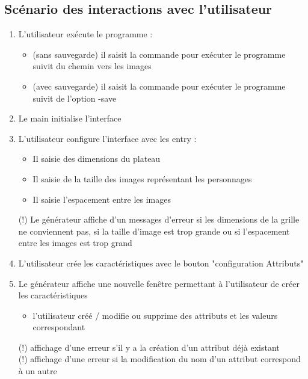 \documentclass[a4paper]{article}
\begin{document}
 \subsection{Scénario des interactions avec l'utilisateur}
 \begin{enumerate}
 \item L'utilisateur exécute le programme : 
 \begin{itemize}
     \item (sans sauvegarde) il saisit la commande pour exécuter le programme suivit du chemin vers les images
     \item (avec sauvegarde) il saisit la commande pour exécuter le programme suivit de l'option -save
 \end{itemize}
 \item Le main initialise l'interface
 \item L'utilisateur configure l'interface avec les entry :
 \begin{itemize}
     \item Il saisie des dimensions du plateau 
     \item Il saisie de la taille des images représentant les personnages
     \item Il saisie l'espacement entre les images
 \end{itemize}
 
 (!) Le générateur affiche d'un messages d'erreur si les dimensions de la grille ne conviennent pas, si la taille d'image est trop grande ou si l'espacement entre les images est trop grand
     
 \item L'utilisateur crée les caractéristiques avec le bouton "configuration Attributs"
 \item Le générateur affiche une nouvelle fenêtre permettant à l'utilisateur de créer les caractéristiques 
 \begin{itemize}
     \item l'utilisateur créé / modifie ou supprime des attributs et les valeurs correspondant
 \end{itemize}
 
 (!) affichage d'une erreur s'il y a la création d'un attribut déjà existant\\
 
 (!) affichage d'une erreur si la modification du nom d'un attribut correspond à un autre\\
 

\end{enumerate}
\end{document}
